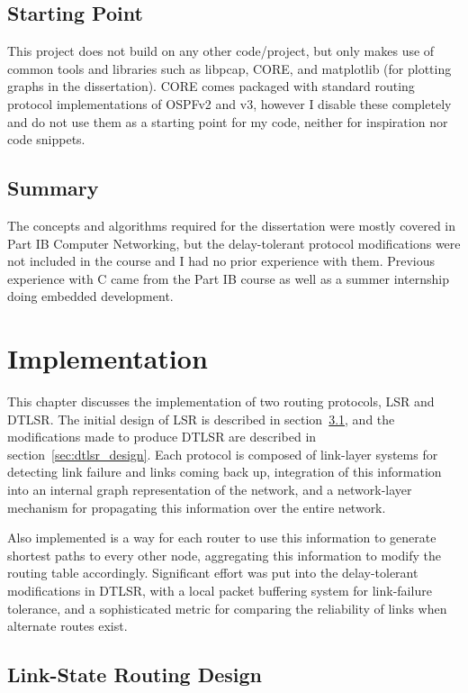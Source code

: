 \documentclass[withindex,glossary,openany]{cam-thesis}
\begin{document}
\section{Starting Point}

This project does not build on any other code/project, but only makes use of common tools and libraries such as libpcap, CORE, and matplotlib (for plotting graphs in the dissertation). CORE comes packaged with standard routing protocol implementations of OSPFv2 and v3, however I disable these completely and do not use them as a starting point for my code, neither for inspiration nor code snippets.

\section{Summary}

The concepts and algorithms required for the dissertation were mostly covered in Part IB Computer Networking, but the delay-tolerant protocol modifications were not included in the course and I had no prior experience with them. Previous experience with C came from the Part IB course as well as a summer internship doing embedded development.

\chapter{Implementation}

This chapter discusses the implementation of two routing protocols, LSR and DTLSR. The initial design of LSR is described in section~\ref{sec:lsr_design}, and the modifications made to produce DTLSR are described in section~\ref{sec:dtlsr_design}. Each protocol is composed of link-layer systems for detecting link failure and links coming back up, integration of this information into an internal graph representation of the network, and a network-layer mechanism for propagating this information over the entire network.

Also implemented is a way for each router to use this information to generate shortest paths to every other node, aggregating this information to modify the routing table accordingly. Significant effort was put into the delay-tolerant modifications in DTLSR, with a local packet buffering system for link-failure tolerance, and a sophisticated metric for comparing the reliability of links when alternate routes exist.

\section{Link-State Routing Design}
\label{sec:lsr_design}
\end{document}
